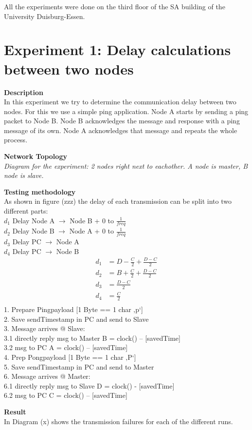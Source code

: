 All the experiments were done on the third floor of the SA building of the University Duisburg-Essen.
\newpage

\section{Experiment 1: Delay calculations between two nodes}
\begin{description} 
	\item{\textbf{Description}} \hfill \\ In this experiment we try to determine the communication delay between two nodes. For this we use a simple ping application. Node A starts by sending a ping packet to Node B. Node B acknowledges the message and response with a ping message of its own. Node A acknowledges that message and repeats the whole process.
	\item{\textbf{Network Topology}} \hfill \\ \textit{Diagram for the experiment:  2 nodes right next to eachother. A node is master, B node is slave.} 
	\item{\textbf{Testing methodology}} \hfill \\ As shown in figure (zzz) the delay of each transmission can be split into two different parts:\\
	$d_1$ Delay Node A $\rightarrow$ Node B + 0 to $\frac{1}{freq}$\\
	$d_2$ Delay Node B $\rightarrow$ Node A + 0 to $\frac{1}{freq}$\\
	$d_3$ Delay PC $\rightarrow$ Node A\\
	$d_4$ Delay PC $\rightarrow$ Node B\\
	\begin{align*}
	d_1 &= D - \frac{C}{2} + \frac{D-C}{2}\\
	d_2 &= B + \frac{C}{2} + \frac{D-C}{2}\\
	d_3 &= \frac{D-C}{2}\\
	d_4 &= \frac{C}{2}\\
	\end{align*}
	1. Prepare Pingpayload [1 Byte == 1 char ‚p‘]\\
	2. Save sendTimestamp in PC and send to Slave\\
	3. Message arrives @ Slave:\\
		3.1 directly reply msg to Master B = clock() – [savedTime]\\
		3.2 msg to PC A = clock() – [savedTime]\\
	4. Prep Pongpayload [1 Byte == 1 char ‚P‘]\\
	5. Save sendTimestamp in PC and send to Master\\
	6. Message arrives @ Master:\\
		6.1 directly reply msg to Slave D = clock() - [savedTime]\\
		6.2 msg to PC C = clock() – [savedTime]\\
	  
	\item{\textbf{Result}} \hfill \\ In Diagram (x) shows the transmission failures for each of the different runs. 
\end{description}

